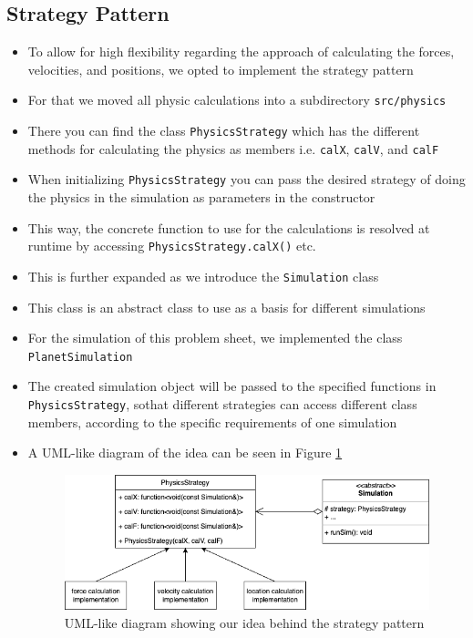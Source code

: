 \documentclass{article}
\begin{document}
\subsection{Strategy Pattern}
\begin{itemize}
    \item To allow for high flexibility regarding the approach of calculating the forces, velocities, and positions, we opted to implement the strategy pattern
    \item For that we moved all physic calculations into a subdirectory \verb|src/physics|
    \item There you can find the class \verb|PhysicsStrategy| which has the different methods for calculating the physics as members i.e. \verb|calX|, \verb|calV|, and \verb|calF|
    \item When initializing \verb|PhysicsStrategy| you can pass the desired strategy of doing the physics in the simulation as parameters in the constructor
    \item This way, the concrete function to use for the calculations is resolved at runtime by accessing \verb|PhysicsStrategy.calX()| etc.
    \item This is further expanded as we introduce the \verb|Simulation| class
    \item This class is an abstract class to use as a basis for different simulations
    \item For the simulation of this problem sheet, we implemented the class \verb|PlanetSimulation|
    \item The created simulation object will be passed to the specified functions in \verb|PhysicsStrategy|, sothat different strategies can access different class members, according to the specific requirements of one simulation
    \item A UML-like diagram of the idea can be seen in Figure \ref{fig:strat}
    \begin{figure}[h]
        \includegraphics[width=\textwidth]{res/strategy.png}
        \caption{UML-like diagram showing our idea behind the strategy pattern}
        \label{fig:strat}
    \end{figure}
\end{itemize}
\end{document}
